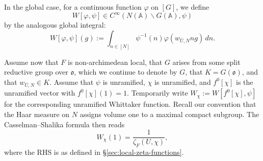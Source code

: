 In the global case, for a continuous function $\varphi$ on $[G]$, we define
\begin{equation*}
  W[\varphi,\psi] \in C^\infty(N(\mathbb{A}) \backslash G(\mathbb{A}), \psi)
\end{equation*}
by the analogous global integral:
\begin{equation*}
  W[\varphi, \psi](g) := \int_{n \in [N]} \psi^{-1}(n)
  \varphi(w_{\bar{U},N} n g) \, d n.
\end{equation*}

Assume now that $F$ is non-archimedean local, that $G$ arises from some split reductive group over $\mathfrak{o}$, which we continue to denote by $G$, that $K = G(\mathfrak{o})$, and that $w_{\bar{U},N} \in K$.  Assume that $\psi$ is unramified, $\chi$ is unramified, and $f^0[\chi]$ is the unramified vector with $f^0[\chi](1) = 1$.  Temporarily write $W_\chi := W[f^0[\chi], \psi]$ for the corresponding unramified Whittaker function.  Recall our convention that the Haar measure on $N$ assigns volume one to a maximal compact subgroup.  The Casselman--Shalika formula \cite[Thm 5.4]{MR581582} then reads
\begin{equation}\label{eq:wf0chi-psi1-casselman-shalika}
  W_\chi(1)
  =
  \frac{1}{\zeta_F(U,\chi)},
\end{equation}
where the RHS is as defined in \S\ref{sec:local-zeta-functions}.


